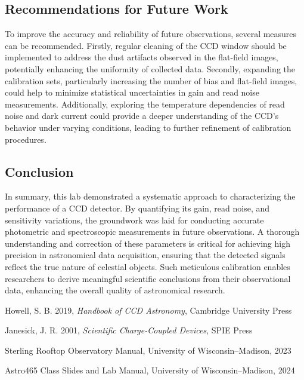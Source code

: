 \documentclass[linenumbers,twocolumn]{aastex631}
\begin{document}
\subsection{Recommendations for Future Work}

To improve the accuracy and reliability of future observations, several measures can be recommended. Firstly, regular cleaning of the CCD window should be implemented to address the dust artifacts observed in the flat-field images, potentially enhancing the uniformity of collected data. Secondly, expanding the calibration sets, particularly increasing the number of bias and flat-field images, could help to minimize statistical uncertainties in gain and read noise measurements. Additionally, exploring the temperature dependencies of read noise and dark current could provide a deeper understanding of the CCD's behavior under varying conditions, leading to further refinement of calibration procedures.

\subsection{Conclusion}

In summary, this lab demonstrated a systematic approach to characterizing the performance of a CCD detector. By quantifying its gain, read noise, and sensitivity variations, the groundwork was laid for conducting accurate photometric and spectroscopic measurements in future observations. A thorough understanding and correction of these parameters is critical for achieving high precision in astronomical data acquisition, ensuring that the detected signals reflect the true nature of celestial objects. Such meticulous calibration enables researchers to derive meaningful scientific conclusions from their observational data, enhancing the overall quality of astronomical research.

\begin{thebibliography}{}

Howell, S. B. 2019, \textit{Handbook of CCD Astronomy}, Cambridge University Press

Janesick, J. R. 2001, \textit{Scientific Charge-Coupled Devices}, SPIE Press

Sterling Rooftop Observatory Manual, University of Wisconsin--Madison, 2023

Astro465 Class Slides and Lab Manual, University of Wisconsin--Madison, 2024

\end{thebibliography}
\end{document}
